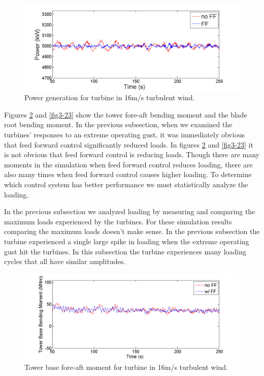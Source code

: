 \begin{figure}[htbp]
	\centering
		\includegraphics[trim = {1cm 0 2cm 0}, clip, width = \linewidth]{Figures/ch3Figures/fig3-21.png}
		
	\caption{Power generation for turbine in 16m/s turbulent wind.}
	\label{fig3-21}
\end{figure}

Figures \ref{fig3-22} and \ref{fig3-23} show the tower fore-aft bending moment and the blade root bending moment. In the previous subsection, when we examined the turbines' responses to an extreme operating gust, it was immediately obvious that feed forward control significantly reduced loads. In figures \ref{fig3-22} and \ref{fig3-23} it is not obvious that feed forward control is reducing loads. Though there are many moments in the simulation when feed forward control reduces loading, there are also many times when feed forward control causes higher loading. To determine which control system has better performance we must statistically analyze the loading.

In the previous subsection we analyzed loading by measuring and comparing the maximum loads experienced by the turbines. For these simulation results comparing the maximum loads doesn't make sense. In the previous subsection the turbine experienced a single large spike in loading when the extreme operating gust hit the turbines. In this subsection the turbine experiences many loading cycles that all have similar amplitudes. 


\begin{figure}[htbp]
	\centering
		\includegraphics[trim = {1cm 0 2cm 0}, clip, width = \linewidth]{Figures/ch3Figures/fig3-22.png}
		
	\caption{Tower base fore-aft moment for turbine in 16m/s turbulent wind.}
	\label{fig3-22}
\end{figure}

